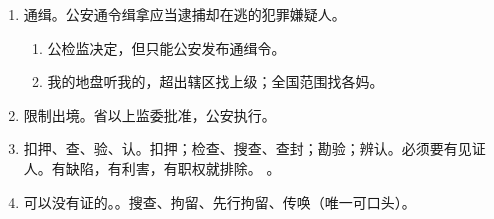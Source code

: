 \begin{enumerate}
\begin{enumerate}
\begin{enumerate}
                  \item {}。
                  \item {}。
                \end{enumerate}
          \item 措施报告书 \yjt 设区的市一级以上公安负责人批准 \yjt 措施决定书。。
          \item 有效期。3 + n 个 3。。
          \item 秘密措施。卧底侦查、隐匿身份（不能引诱犯罪）、控制下交付、诱惑侦查、跟踪。
          \item 启动只需批一次，后续措施找负责人即可。
          \item {}。
          \item 得来的证据保密 \hz 销毁。。
        \end{enumerate}
  \item 通缉。公安通令缉拿应当逮捕却在逃的犯罪嫌疑人。
        \begin{enumerate}
          \item 公检监决定，但只能公安发布通缉令。
          \item 我的地盘听我的，超出辖区找上级；全国范围找各妈。
        \end{enumerate}
  \item 限制出境。省以上监委批准，公安执行。
  \item 扣押、查、验、认。扣押；检查、搜查、查封；勘验；辨认。必须要有见证人。有缺陷，有利害，有职权就排除。
        。
  \item 可以没有证的。。搜查、拘留、先行拘留、传唤（唯一可口头）。
\end{enumerate}
